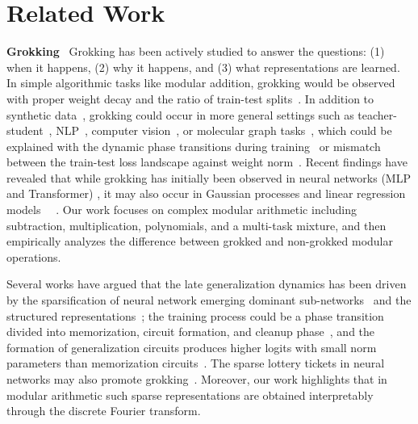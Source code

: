 \documentclass[10pt]{article} %
\newcommand{\update}[1]{{\color{black}{#1}}}
\begin{document}
\section{Related Work}
\label{sec:related}
\textbf{Grokking}~
Grokking has been actively studied to answer the questions: (1) when it happens, (2) why it happens, and (3) what representations are learned.
In simple algorithmic tasks like modular addition, grokking would be observed with proper weight decay and the ratio of train-test splits~\citep{power2022grokking,lyu2023dichotomy}. In addition to synthetic data~\citep{liu2023grokking}, grokking could occur in more general settings such as teacher-student~\citep{levi2023grokking}, NLP~\citep{murty2023grokking}, computer vision~\citep{thilak2022slingshot}, or molecular graph tasks~\citep{liu2023omnigrok}, which could be explained with the dynamic phase transitions during training~\citep{rubin2023droplets,kumar2023grokking} or mismatch between the train-test loss landscape against weight norm~\citep{liu2023omnigrok}.
Recent findings have revealed that while grokking has initially been observed in neural networks (MLP and Transformer) \update{with weight decay}, it may also occur in Gaussian processes and linear regression models~\citep{levi2023grokking,miller2023grokking} \update{or even the case without weight decay}~\citep{kumar2023grokking}.
Our work focuses on complex modular arithmetic including subtraction, multiplication, polynomials, and a multi-task mixture, and then empirically analyzes the difference between grokked and non-grokked modular operations.

Several works have argued that the late generalization dynamics has been driven by the sparsification of neural network emerging dominant sub-networks~\citep{merrill2023tale,tan2023understanding} and the structured representations~\citep{liu2022understanding}; the training process could be a phase transition divided into memorization, circuit formation, and cleanup phase~\citep{nanda2023progress,xu2023benign,doshi2023grok,davies2023unifying,žunkovič2022grokking}, and the formation of generalization circuits produces higher logits with small norm parameters than memorization circuits~\citep{varma2023explaining}. The sparse lottery tickets in neural networks may also promote grokking~\citep{minegishi2023grokking}.
Moreover, our work highlights that in modular arithmetic such sparse representations are obtained interpretably through the discrete Fourier transform.
\end{document}
